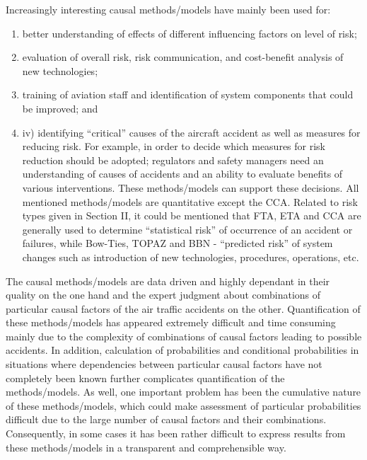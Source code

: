 \documentclass[a4paper, 10pt]{article}
\begin{document}
Increasingly interesting causal methods/models have
mainly been used for:
\begin{enumerate}
	\item better understanding of effects of
different influencing factors on level of risk; 
	\item evaluation of
overall risk, risk communication, and cost-benefit analysis of
new technologies; 
	\item training of aviation staff and
identification of system components that could be improved;
and 
	\item iv) identifying “critical” causes of the aircraft accident as
well as measures for reducing risk. For example, in order to
decide which measures for risk reduction should be adopted;
regulators and safety managers need an understanding of
causes of accidents and an ability to evaluate benefits of
various interventions. These methods/models can support these
decisions. All mentioned methods/models are quantitative
except the CCA. Related to risk types given in Section II, it
could be mentioned that FTA, ETA and CCA are generally
used to determine “statistical risk” of occurrence of an accident
or failures, while Bow-Ties, TOPAZ and BBN - “predicted
risk” of system changes such as introduction of new
technologies, procedures, operations, etc.
\end{enumerate}\par

The causal methods/models are data driven and highly
dependant in their quality on the one hand and the expert
judgment about combinations of particular causal factors of the
air traffic accidents on the other. Quantification of these
methods/models has appeared extremely difficult and time
consuming mainly due to the complexity of combinations of
causal factors leading to possible accidents. In addition,
calculation of probabilities and conditional probabilities in
situations where dependencies between particular causal
factors have not completely been known further complicates
quantification of the methods/models. As well, one important
problem has been the cumulative nature of these
methods/models, which could make assessment of particular
probabilities difficult due to the large number of causal factors
and their combinations. Consequently, in some cases it has
been rather difficult to express results from these
methods/models in a transparent and comprehensible way.\par
\end{document}
